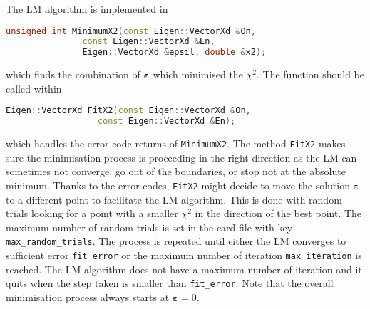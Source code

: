 \documentclass[a4paper, 11pt]{article}
\newcommand{\bs}{\boldsymbol}
\begin{document}
The LM algorithm is implemented in 
\begin{lstlisting}[language=C++]
    unsigned int MinimumX2(const Eigen::VectorXd &On,
			   const Eigen::VectorXd &En,
			   Eigen::VectorXd &epsil, double &x2);
\end{lstlisting}
which finds the combination of $\bs{\varepsilon}$ which minimised the $\chi^2$.
The function should be called within 
\begin{lstlisting}[language=C++]
    Eigen::VectorXd FitX2(const Eigen::VectorXd &On,
		          const Eigen::VectorXd &En);
\end{lstlisting}
which handles the error code returns of \texttt{MinimumX2}.
The method \texttt{FitX2} makes sure the minimisation process is proceeding in the right direction %
as the LM can sometimes not converge, go out of the boundaries, or stop not at the absolute minimum.
Thanks to the error codes, \texttt{FitX2} might decide to move the solution $\bs{\varepsilon}$ to %
a different point to facilitate the LM algorithm.
This is done with random trials looking for a point with a smaller $\chi^2$ in the direction of the best point.
The maximum number of random trials is set in the card file with key \texttt{max\_random\_trials}.
The process is repeated until either the LM converges to sufficient error \texttt{fit\_error} or %
the maximum number of iteration \texttt{max\_iteration} is reached.
The LM algorithm does not have a maximum number of iteration and it quits when the step taken is smaller than \texttt{fit\_error}.
Note that the overall minimisation process always starts at $\bs{\varepsilon} = 0$.



\end{document}

